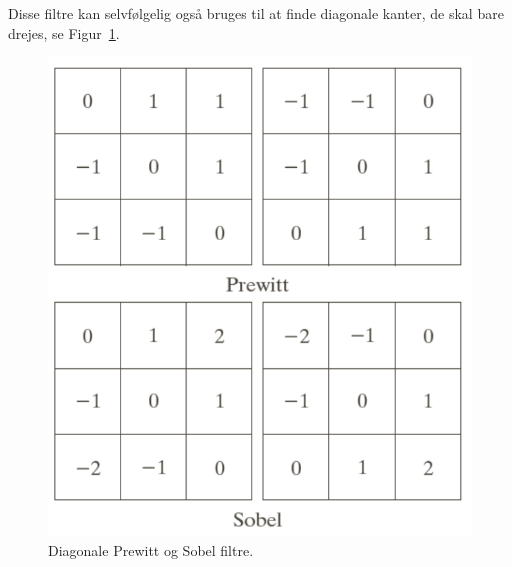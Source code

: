 Disse filtre kan selvfølgelig også bruges til at finde diagonale kanter, de skal bare drejes, se Figur~\ref{fig:prewitt-and-sobel-diag-filter}.

\begin{figure}[H]
	\centering
	\includegraphics[width=0.5\linewidth]{figs/spm03/prewitt-and-sobel-diag-filter}
	\caption{Diagonale Prewitt og Sobel filtre.}
	\label{fig:prewitt-and-sobel-diag-filter}
\end{figure}
